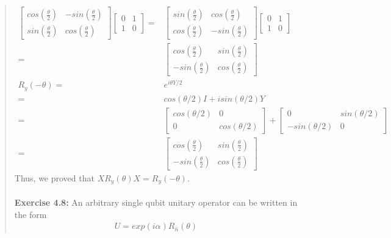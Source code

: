 \documentclass[UTF8]{ctexart}
\begin{document}
\begin{quote}
\begin{equation}
\begin{aligned}
			\begin{bmatrix}
			cos(\frac{\theta}{2}) &-sin(\frac{\theta}{2})	 \\ sin(\frac{\theta}{2})    &cos(\frac{\theta}{2})
			\end{bmatrix}
			\begin{bmatrix}
				0 & 1 \\ 1 &0
			\end{bmatrix}
			=&\begin{bmatrix}
				sin(\frac{\theta}{2})	&cos(\frac{\theta}{2}) \\ cos(\frac{\theta}{2}) &-sin(\frac{\theta}{2})	
			\end{bmatrix}
			\begin{bmatrix}
				0 & 1 \\ 1 &0
			\end{bmatrix}\\
			=& \begin{bmatrix}
				cos(\frac{\theta}{2}) &sin(\frac{\theta}{2})	\\	-sin(\frac{\theta}{2})	&cos(\frac{\theta}{2})
			\end{bmatrix}
			\\
			R_{y}(-\theta)=&e^{i\theta Y/2} \\ 
			=&cos(\theta/2)I+isin(\theta/2)Y  \\
			=&\begin{bmatrix}
				cos(\theta/2) &0\\0 &cos(\theta/2)
			\end{bmatrix}+
			\begin{bmatrix}
			0 & sin(\theta/2)\\ -sin(\theta/2) &0 
			\end{bmatrix} \\
			=&\begin{bmatrix}
				cos(\frac{\theta}{2}) &sin(\frac{\theta}{2})	\\	-sin(\frac{\theta}{2})	&cos(\frac{\theta}{2})
			\end{bmatrix}
		\end{aligned}
	\end{equation}
	Thus, we proved that $XR_{y}(\theta)X = R_{y}(−\theta)$.
	\\
\\
\textbf{Exercise 4.8: } An arbitrary single qubit unitary operator can be written in the form \\
\begin{equation}
	\begin{aligned}
		U = exp(i\alpha)R_{\hat{n}} (\theta)

\end{aligned}
\end{equation}
\end{quote}
\end{document}

